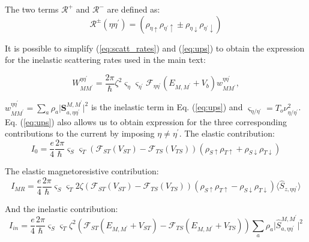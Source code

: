\documentclass[reprint,amsmath,amssymb,aps,nofootinbib,onecolumn]{revtex4-2}
\begin{document}
The two terms $\mathcal{R}^{+}$ and $\mathcal{R}^{-}$ are defined as:
\begin{equation}
    \mathcal{R}^{\pm}(\eta\eta^{\prime})=\left( \rho_{\eta \uparrow} \rho_{\eta^{\prime}\uparrow} \pm \rho_{\eta \downarrow} \rho_{\eta^{\prime}\downarrow} \right)
    \label{eq:R_+-}
\end{equation}

It is possible to simplify (\ref{eq:scatt_rates}) and (\ref{eq:ups}) to obtain the expression for the inelastic scattering rates used in the main text:

\begin{equation}
    W_{MM^{\prime}}^{\eta \eta^{\prime}}=\dfrac{2\pi}{\hbar} \zeta^2 \varsigma_{\eta} \varsigma_{\eta^{\prime}} \mathcal{F}_{\eta\eta^{\prime}}(E_{M,M^{\prime}}+V_{b} )  w_{MM^{\prime}}^{\eta \eta^{\prime}},
    \label{eq:elec_rates}
\end{equation}

 $w_{MM^{\prime}}^{\eta \eta^{\prime}} = \sum_{a} \rho_a \lvert {\textbf{S}_{a,\eta\eta^{\prime}}^{M,M^{\prime}}}\rvert^{2}$ is the inelastic term in Eq. (\ref{eq:ups}) and $\varsigma_{\eta/\eta^{\prime}} = T_o \nu^2_{\eta/\eta^{\prime}}$. Eq. (\ref{eq:ups}) also allows us to obtain expression for the three corresponding contributions to the current by imposing $\eta \neq \eta^{\prime} $.
The elastic contribution:
\begin{equation}
I_0=\dfrac{e}{4} \dfrac{2\pi}{\hbar}  \varsigma_{S} \varsigma_{T} \left( \mathcal{F}_{ST}(V_{ST})-\mathcal{F}_{TS}(V_{TS}) \right) \left( \rho_{S \uparrow} \rho_{T\uparrow} + \rho_{S \downarrow} \rho_{T\downarrow} \right)
\label{eq:I_0}
\end{equation}

The elastic magnetoresistive contribution:
\begin{equation}
I_{MR}=\dfrac{e}{4} \dfrac{2\pi}{\hbar}\varsigma_{S} \varsigma_{T}  2 \zeta  \left( \mathcal{F}_{ST}(V_{ST})-\mathcal{F}_{TS}(V_{TS}) \right) \left( \rho_{S \uparrow} \rho_{T\uparrow} - \rho_{S \downarrow} \rho_{T\downarrow} \right) \langle \hat{S}_{z,\eta\eta^{\prime}} \rangle
\label{eq:I_MR}
\end{equation}

And the inelastic contribution:
\begin{equation}
I_{in}=\dfrac{e}{4} \dfrac{2\pi}{\hbar}\varsigma_{S} \varsigma_{T} \zeta^2  \left( \mathcal{F}_{ST}(E_{M,M^{\prime}}+V_{ST})-\mathcal{F}_{TS}(E_{M,M^{\prime}}+V_{TS}) \right) \sum_{a} \rho_a \lvert {\hat{S}_{a,\eta\eta^{\prime}}^{M,M^{\prime}}}\rvert^{2}
\label{eq:I_in}
\end{equation}
\end{document}
